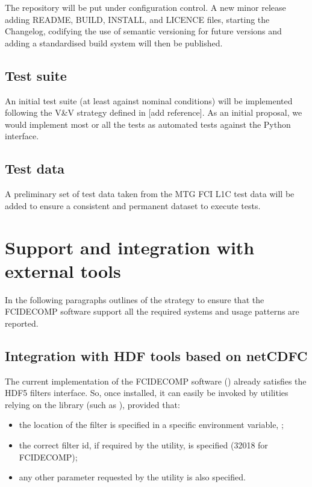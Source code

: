 \documentclass[a4paper,10pt,english]{sphinxmanual}
\begin{document}
\sphinxAtStartPar
The repository will be put under configuration control. A new minor release adding README, BUILD, INSTALL, and LICENCE
files, starting the Changelog, codifying the use of semantic versioning for future versions and adding a standardised
build system will then be published.


\section{Test suite}
\label{\detokenize{canonical_repository:test-suite}}
\sphinxAtStartPar
An initial test suite (at least against nominal conditions) will be implemented following the V\&V strategy defined in
{[}add reference{]}. As an initial proposal, we would implement most or all the tests as automated tests against the Python
interface.


\section{Test data}
\label{\detokenize{canonical_repository:test-data}}
\sphinxAtStartPar
A preliminary set of test data taken from the MTG FCI L1C test data will be added to ensure a consistent and permanent
dataset to execute tests.


\chapter{Support and integration with external tools}
\label{\detokenize{support_and_integration:support-and-integration-with-external-tools}}\label{\detokenize{support_and_integration::doc}}
\sphinxAtStartPar
In the following paragraphs outlines of the strategy to ensure that the FCIDECOMP software support all the required
systems and usage patterns are reported.


\section{Integration with HDF tools based on netCDF\sphinxhyphen{}C}
\label{\detokenize{support_and_integration:integration-with-hdf-tools-based-on-netcdf-c}}
\sphinxAtStartPar
The current implementation of the FCIDECOMP software ({\hyperref[\detokenize{introduction:fcidecomp-latest}]{}}) already satisfies the HDF5
filters interface. So, once installed, it can easily be invoked by utilities relying on the  library (such
as ), provided that:
\begin{itemize}
\item {} 
\sphinxAtStartPar
the location of the filter is specified in a specific environment variable, ;

\item {} 
\sphinxAtStartPar
the correct filter id, if required by the utility, is specified (32018 for FCIDECOMP);

\item {} 
\sphinxAtStartPar
any other parameter requested by the utility is also specified.

\end{itemize}
\end{document}
